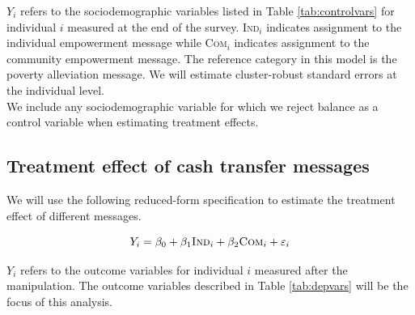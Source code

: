 \documentclass[11pt, a4paper]{article}\usepackage[]{graphicx}\usepackage[]{color}
\begin{document}
        $Y_{i}$ refers to the sociodemographic variables listed in Table \ref{tab:controlvars} for individual $i$ measured at the end of the survey. \textsc{Ind}$_{i}$ indicates assignment to the individual empowerment message while \textsc{Com}$_{i}$ indicates assignment to the community empowerment message. The reference category in this model is the poverty alleviation message. We will estimate cluster-robust standard errors at the individual level. \\

        We include any sociodemographic variable for which we reject balance as a control variable when estimating treatment effects.

    \subsection{Treatment effect of cash transfer messages}

        We will use the following reduced-form specification to estimate the treatment effect of different messages.

  		\begin{equation} \label{eq:teffect}
            Y_{i} = \beta_{0} + \beta_{1}\text{\textsc{Ind}}_{i} + \beta_{2}\text{\textsc{Com}}_{i} + \varepsilon_{i}
		\end{equation}

        $Y_{i}$ refers to the outcome variables for individual $i$ measured after the manipulation. The outcome variables described in Table \ref{tab:depvars} will be the focus of this analysis.

        \begin{table}[h]
        \centering
        \caption{Primary outcome variables}
        \label{tab:depvars}
        \end{table}
\end{document}
